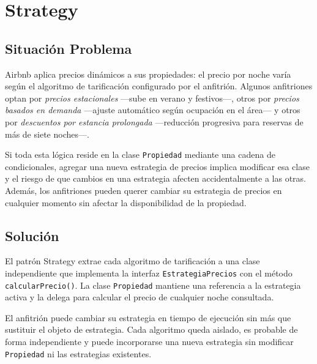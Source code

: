 
\chapter{Strategy}

\section{Situación Problema}

Airbnb aplica precios dinámicos a sus propiedades: el precio por noche
varía según el algoritmo de tarificación configurado por el anfitrión.
Algunos anfitriones optan por \emph{precios estacionales} —sube en
verano y festivos—, otros por \emph{precios basados en demanda} —ajuste
automático según ocupación en el área— y otros por \emph{descuentos por
estancia prolongada} —reducción progresiva para reservas de más de siete
noches—.

Si toda esta lógica reside en la clase \texttt{Propiedad} mediante una
cadena de condicionales, agregar una nueva estrategia de precios implica
modificar esa clase y el riesgo de que cambios en una estrategia afecten
accidentalmente a las otras. Además, los anfitriones pueden querer cambiar
su estrategia de precios en cualquier momento sin afectar la disponibilidad
de la propiedad.

\section{Solución}

El patrón Strategy extrae cada algoritmo de tarificación a una clase
independiente que implementa la interfaz \texttt{EstrategiaPrecios} con
el método \texttt{calcularPrecio()}. La clase \texttt{Propiedad} mantiene
una referencia a la estrategia activa y la delega para calcular el precio
de cualquier noche consultada.

El anfitrión puede cambiar su estrategia en tiempo de ejecución sin más
que sustituir el objeto de estrategia. Cada algoritmo queda aislado,
es probable de forma independiente y puede incorporarse una nueva
estrategia sin modificar \texttt{Propiedad} ni las estrategias existentes.

